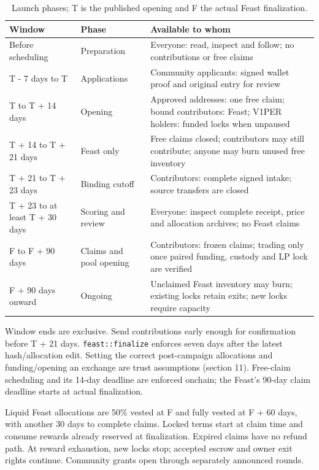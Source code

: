 \documentclass[11pt]{article}
\newcommand{\VOnePER}{\texorpdfstring{V\textcolor{brandone}{1}PER}{V1PER}}
\begin{document}
\begin{table}[H]\centering\small
\caption{Launch phases; T is the published opening and F the actual Feast finalization.}
\begin{tabularx}{\textwidth}{l X X}
\toprule
\textbf{Window} & \textbf{Phase} & \textbf{Available to whom} \\
\midrule
Before scheduling & Preparation & Everyone: read, inspect and follow; no contributions or free claims \\
T - 7 days to T & Applications & Community applicants: signed wallet proof and original entry for review \\
T to T + 14 days & Opening & Approved addresses: one free claim; bound contributors: Feast; \VOnePER{} holders: funded locks when unpaused \\
T + 14 to T + 21 days & Feast only & Free claims closed; contributors may still contribute; anyone may burn unused free inventory \\
T + 21 to T + 23 days & Binding cutoff & Contributors: complete signed intake; source transfers are closed \\
T + 23 to at least T + 30 days & Scoring and review & Everyone: inspect complete receipt, price and allocation archives; no Feast claims \\
F to F + 90 days & Claims and pool opening & Contributors: frozen claims; trading only once paired funding, custody and LP lock are verified \\
F + 90 days onward & Ongoing & Unclaimed Feast inventory may burn; existing locks retain exits; new locks require capacity \\
\bottomrule\end{tabularx}
\end{table}

Window ends are exclusive. Send contributions early enough for confirmation before T + 21 days. \texttt{feast::finalize} enforces seven days after the latest hash/allocation edit. Setting the correct post-campaign allocations and funding/opening an exchange are trust assumptions (section 11). Free-claim scheduling and its 14-day deadline are enforced onchain; the Feast's 90-day claim deadline starts at actual finalization.

Liquid Feast allocations are 50\% vested at F and fully vested at F + 60 days, with another 30 days to complete claims. Locked terms start at claim time and consume rewards already reserved at finalization. Expired claims have no refund path. At reward exhaustion, new locks stop; accepted escrow and owner exit rights continue. Community grants open through separately announced rounds.
\end{document}

